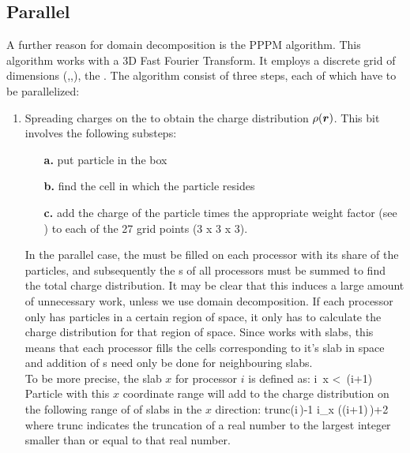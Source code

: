 \subsection{Parallel }
A further reason for domain decomposition is the PPPM algorithm. This
algorithm works with a 3D Fast Fourier Transform. It employs a
discrete grid of dimensions (\nx,\ny,\nz), the {\fftgrid}. The
algorithm consist of three steps, each of which have to be
parallelized:
\begin{enumerate}
\item	Spreading charges on the {\fftgrid} to obtain the charge 
	distribution $\rho(\mbox{\boldmath ${r}$})$.
	This bit involves the following substeps:
	\begin{enumerate}
	\item[{\bf a.}] put particle in the box
	\item[{\bf b.}] find the {\fftgrid} cell in which the particle resides
	\item[{\bf c.}] add the charge of the particle times the appropriate
			weight factor (see ) to 
			each of the 27 grid points (3 x 3 x 3).
	\end{enumerate}
	In the parallel case, the {\fftgrid} 
	must be filled on each processor with its
	share of the particles, and subsequently the {\fftgrid}s of all processors
	must be summed to find the total charge distribution. It may be clear that
	this induces a large amount of unnecessary work, unless we use domain
	decomposition. If each processor only has particles in a certain region
	of space, it only has to calculate the charge distribution for 
	that region of space. Since {\gromacs} works with slabs, this means that
	each processor fills the {\fftgrid} cells corresponding to it's slab in space
	and addition of {\fftgrid}s need only be done for neighbouring slabs.\\
	To be more precise, the slab $x$ for processor $i$ is defined as:
	\beq
	i\,  \le x <\, (i+1)
	\eeq
	Particle with this $x$ coordinate range will add to the charge distribution
	on the following range of 
	of {\fftgrid} slabs in the $x$ direction:
	\beq
	{\rm trunc}\left(i\,\right)-1 \le i_x \left((i+1)\,\right)+2
	\eeq
	where trunc indicates the truncation of a real number to the largest integer
	smaller than or equal to that real number.
	

\end{enumerate}

